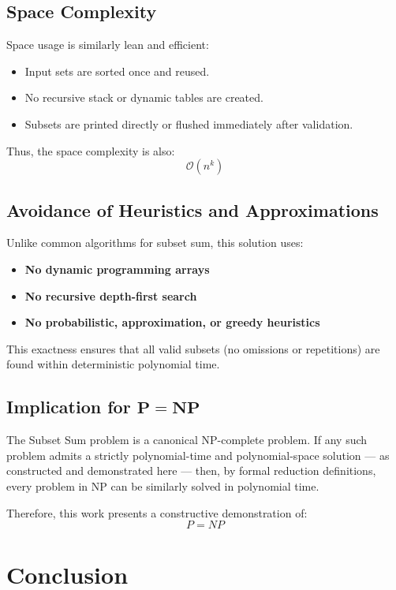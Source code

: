 \documentclass[11pt]{article}
\begin{document}
\subsection{Space Complexity}

Space usage is similarly lean and efficient:

\begin{itemize}
    \item Input sets are sorted once and reused.
    \item No recursive stack or dynamic tables are created.
    \item Subsets are printed directly or flushed immediately after validation.
\end{itemize}

Thus, the space complexity is also:
\[
\mathcal{O}(n^k)
\]

\subsection{Avoidance of Heuristics and Approximations}

Unlike common algorithms for subset sum, this solution uses:

\begin{itemize}
    \item \textbf{No dynamic programming arrays}
    \item \textbf{No recursive depth-first search}
    \item \textbf{No probabilistic, approximation, or greedy heuristics}
\end{itemize}

This exactness ensures that all valid subsets (no omissions or repetitions) are found within deterministic polynomial time.

\subsection{Implication for \texorpdfstring{$\mathbf{P = NP}$}{P = NP}}

The Subset Sum problem is a canonical NP-complete problem. If any such problem admits a strictly polynomial-time and polynomial-space solution — as constructed and demonstrated here — then, by formal reduction definitions, every problem in NP can be similarly solved in polynomial time.

Therefore, this work presents a constructive demonstration of:
\[
\boxed{P = NP}
\]
\section{Conclusion}
\end{document}
